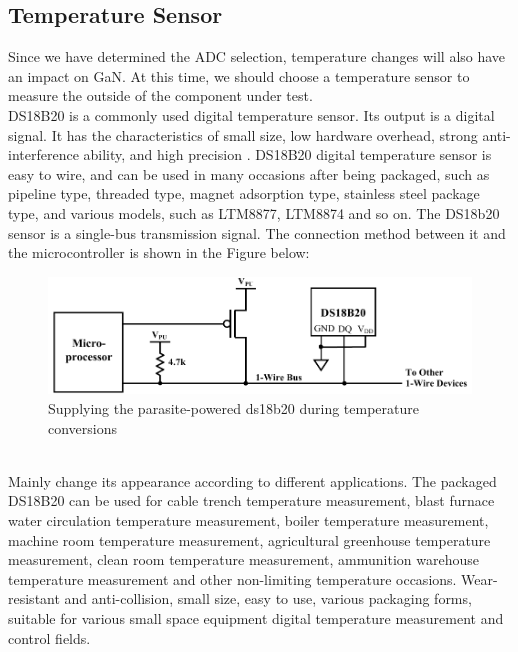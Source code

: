\subsection{Temperature Sensor}
\label{sec:Temperature Sensor}
Since we have determined the ADC selection, temperature changes will also
have an impact on GaN.
At this time, we should choose a temperature sensor to measure the outside
of the component under test.
\\
DS18B20 is a commonly used digital temperature sensor. Its output is a digital
signal. It has the characteristics of small size, low hardware overhead, strong
anti-interference ability, and high precision \cite{li2005principle}. DS18B20 digital temperature
sensor is easy to wire, and can be used in many occasions after being
packaged, such as pipeline type, threaded type, magnet adsorption type,
stainless steel package type, and various models, such as LTM8877, LTM8874
and so on.
The DS18b20 sensor is a single-bus transmission signal. The connection
method between it and the microcontroller is shown in the Figure below:

\begin{figure}[!ht]
	\centering
	\includegraphics[width=15cm]{grafiken/5.1.pdf}
	\caption{Supplying the parasite-powered ds18b20 during temperature conversions} 
	\label{fig:5.1}
\end{figure}
\FloatBarrier
\\
Mainly change its appearance according to different applications. The packaged DS18B20 can be used for cable trench temperature measurement, blast furnace water circulation temperature measurement, boiler temperature measurement, machine room temperature measurement, agricultural greenhouse temperature measurement, clean room temperature measurement, ammunition warehouse temperature measurement and other non-limiting temperature occasions. Wear-resistant and anti-collision, small size, easy to use, various packaging forms, suitable for various small space equipment digital temperature measurement and control fields.


